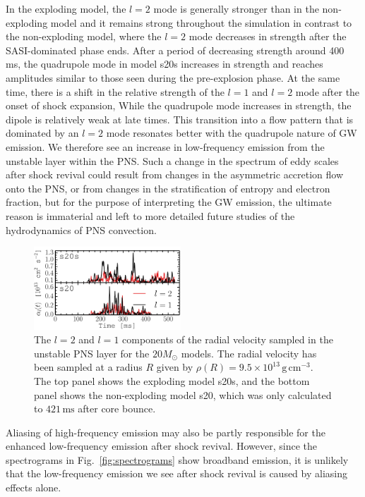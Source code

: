 In the exploding model, the $l=2$ mode is generally stronger than in the non-exploding model and
it remains strong throughout the simulation in contrast to the non-exploding model,
where the $l=2$ mode decreases in strength after the SASI-dominated phase ends.
After a period of decreasing strength around 400 ms, the quadrupole mode in model s20s increases in 
strength and reaches amplitudes similar to those seen during the pre-explosion phase.
At the same time, there is a shift in the relative 
strength of the $l=1$ and $l=2$ mode after the onset of shock expansion,
While the quadrupole mode increases in strength, the dipole is relatively weak at late times.
This transition into a flow pattern that is dominated by an $l=2$ mode resonates better with the
quadrupole nature of GW emission. We therefore see an increase in low-frequency emission
from the unstable layer within the PNS.
Such a change in the spectrum of eddy scales after shock revival
could result from changes in the asymmetric accretion flow onto
the PNS, or from changes in the stratification of entropy and electron
fraction, but for the purpose of interpreting the GW
emission, the ultimate reason is immaterial and left to more detailed future studies of the
hydrodynamics of PNS convection.
\begin{figure}
\includegraphics[width=0.49\textwidth]{./images/chp1/fig14.pdf}
\caption{The $l=2$ and $l=1$ components of the radial
velocity sampled in the unstable PNS layer for the $20 M_\odot$ models. The radial velocity has been sampled
at a radius $R$ given by $\rho(R) = 9.5 \times 10^{13}\, \mathrm{g} \, \mathrm{cm}^{-3}$.  The top panel
shows the exploding model s20s, and the bottom panel shows the non-exploding model s20, which was only calculated to $421 \, \mathrm{ms}$ after core bounce.
\label{fig:al2}
}
\end{figure}
Aliasing of high-frequency emission may also be partly responsible for the enhanced low-frequency emission after shock revival. However,
since the spectrograms in Fig.~\ref{fig:spectrograms} show broadband emission, it is unlikely that the low-frequency emission we see 
after shock revival is caused by aliasing effects alone. 

